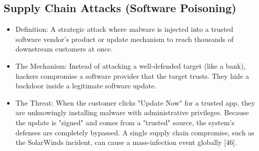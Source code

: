 \subsection{Supply Chain Attacks (Software Poisoning)}

\begin{itemize}
  \item Definition: A strategic attack where malware is injected into a trusted software vendor's product or update mechanism to reach thousands of downstream customers at once.
  \item The Mechanism: Instead of attacking a well-defended target (like a bank), hackers compromise a software provider that the target trusts. They hide a backdoor inside a legitimate software update.
  \item The Threat: When the customer clicks "Update Now" for a trusted app, they are unknowingly installing malware with administrative privileges. Because the update is "signed" and comes from a "trusted" source, the system's defenses are completely bypassed. A single supply chain compromise, such as the SolarWinds incident, can cause a mass-infection event globally [46].
\end{itemize}
